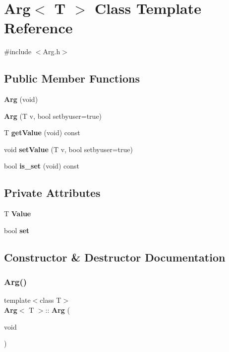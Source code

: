 \section{Arg$<$ T $>$ Class Template Reference}
\label{classArg}


{\ttfamily \#include $<$Arg.\+h$>$}

\subsection*{Public Member Functions}
\begin{DoxyCompactItemize}
\item 
\textbf{ Arg} (void)
\item 
\textbf{ Arg} (T v, bool setbyuser=true)
\item 
T \textbf{ get\+Value} (void) const
\item 
void \textbf{ set\+Value} (T v, bool setbyuser=true)
\item 
bool \textbf{ is\+\_\+set} (void) const
\end{DoxyCompactItemize}
\subsection*{Private Attributes}
\begin{DoxyCompactItemize}
\item 
T \textbf{ Value}
\item 
bool \textbf{ set}
\end{DoxyCompactItemize}


\subsection{Constructor \& Destructor Documentation}
\mbox{\label{classArg_a90687d6831e7123a83e0962bc02c9902}} 
\subsubsection{Arg()\hspace{0.1cm}{\footnotesize\ttfamily [1/2]}}
{\footnotesize\ttfamily template$<$class T$>$ \\
\textbf{ Arg}$<$ T $>$\+::\textbf{ Arg} (\begin{DoxyParamCaption}\item[{void}]{ }\end{DoxyParamCaption})\hspace{0.3cm}{\ttfamily [inline]}}

